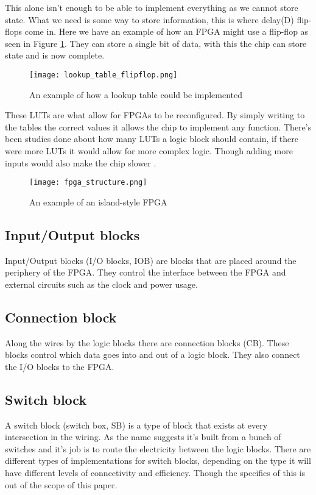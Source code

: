 This alone isn't enough to be able to implement everything as we cannot store
state. What we need is some way to store information, this is where delay(D)
flip-flops come in. Here we have an example of how an FPGA might use a
flip-flop as seen in Figure \ref{fig:lut_flipflop}. They can store a single bit of data, with
this the chip can store state and is now complete.

\begin{figure}[H]
    \centering
    \texttt{[image: lookup\_table\_flipflop.png]}
    \caption{An example of how a lookup table could be implemented \cite{m_d_mano_digital_2012}}
    \label{fig:lut_flipflop}
\end{figure}

These LUTs are what allow for FPGAs to be reconfigured. By simply writing to
the tables the correct values it allows the chip to implement any function.
There's been studies done about how many LUTs a logic block should contain, if
there were more LUTs it would allow for more complex logic. Though adding more
inputs would also make the chip slower \cite{amano_principles_2018}.

\begin{figure}[H]
    \centering
    \label{fig:fpga_structure}
    \texttt{[image: fpga\_structure.png]}
    \caption{An example of an island-style FPGA\cite{m_d_mano_digital_2012}}
\end{figure}

\subsection{Input/Output blocks}
Input/Output blocks (I/O blocks, IOB) are blocks that are placed around the
periphery of the FPGA. They control the interface between the FPGA and external
circuits such as the clock and power usage.

\subsection{Connection block}
Along the wires by the logic blocks there are connection blocks (CB). These blocks
control which data goes into and out of a logic block. They also connect the
I/O blocks to the FPGA.

\subsection{Switch block}
A switch block (switch box, SB) is a type of block that exists at every
intersection in the wiring. As the name suggests it's built from a bunch of
switches and it's job is to route the electricity between the logic blocks.
There are different types of implementations for switch blocks, depending on
the type it will have different levels of connectivity and efficiency. Though
the specifics of this is out of the scope of this paper.

